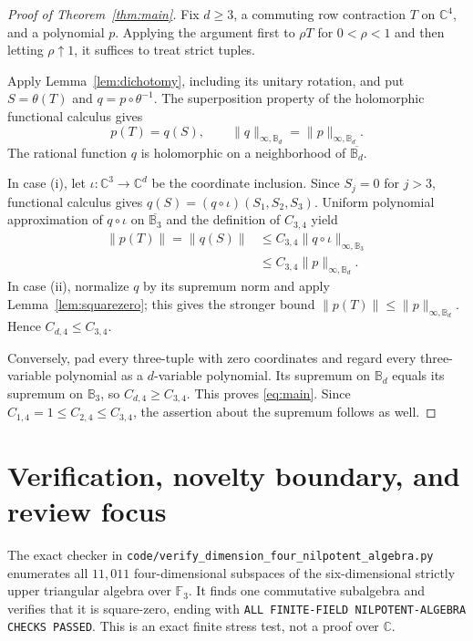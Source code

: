 \documentclass[11pt]{article}
\theoremstyle{remark}
\newcommand{\B}{\mathbb B}
\newcommand{\C}{\mathbb C}
\begin{document}
\begin{proof}[Proof of Theorem~\ref{thm:main}]
Fix $d\geq3$, a commuting row contraction $T$ on $\C^4$, and a polynomial
$p$.  Applying the argument first to $\rho T$ for $0<\rho<1$ and then
letting $\rho\uparrow1$, it suffices to treat strict tuples.

Apply Lemma~\ref{lem:dichotomy}, including its unitary rotation, and put
$S=\theta(T)$ and $q=p\circ\theta^{-1}$.  The superposition property of the
holomorphic functional calculus gives
\begin{equation}\label{eq:superposition}
 p(T)=q(S),\qquad \|q\|_{\infty,\B_d}=\|p\|_{\infty,\B_d}.
\end{equation}
The rational function $q$ is holomorphic on a neighborhood of
$\overline{\B_d}$.

In case (i), let $\iota:\C^3\to\C^d$ be the coordinate inclusion.  Since
$S_j=0$ for $j>3$, functional calculus gives
$q(S)=(q\circ\iota)(S_1,S_2,S_3)$.  Uniform polynomial approximation of
$q\circ\iota$ on $\overline{\B_3}$ and the definition of $C_{3,4}$ yield
\begin{align*}
 \|p(T)\|=\|q(S)\|
 &\leq C_{3,4}\|q\circ\iota\|_{\infty,\B_3}\\
 &\leq C_{3,4}\|p\|_{\infty,\B_d}.
\end{align*}
In case (ii), normalize $q$ by its supremum norm and apply
Lemma~\ref{lem:squarezero}; this gives the stronger bound
$\|p(T)\|\leq\|p\|_{\infty,\B_d}$.  Hence $C_{d,4}\leq C_{3,4}$.

Conversely, pad every three-tuple with zero coordinates and regard every
three-variable polynomial as a $d$-variable polynomial.  Its supremum on
$\B_d$ equals its supremum on $\B_3$, so $C_{d,4}\geq C_{3,4}$.  This proves
\eqref{eq:main}.  Since $C_{1,4}=1\leq C_{2,4}\leq C_{3,4}$, the assertion
about the supremum follows as well.
\end{proof}

\section{Verification, novelty boundary, and review focus}

The exact checker in \texttt{code/verify\_dimension\_four\_nilpotent\_algebra.py}
enumerates all $11{,}011$ four-dimensional subspaces of the six-dimensional
strictly upper triangular algebra over $\mathbb F_3$.  It finds one
commutative subalgebra and verifies that it is square-zero, ending with
\texttt{ALL FINITE-FIELD NILPOTENT-ALGEBRA CHECKS PASSED}.  This is an exact
finite stress test, not a proof over $\C$.
\end{document}
